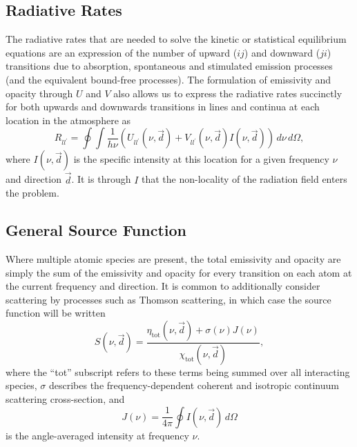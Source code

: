 \subsection{Radiative Rates}

The radiative rates that are needed to solve the kinetic or statistical equilibrium equations are an expression of the number of upward ($ij$) and downward ($ji$) transitions due to absorption, spontaneous and stimulated emission processes (and the equivalent bound-free processes).
The formulation of emissivity and opacity through $U$ and $V$ also allows us to express the radiative rates succinctly for both upwards and downwards transitions in lines and continua at each location in the atmosphere as
\begin{equation}
    \label{Eq:RadiativeRates}
    R_{ll^\prime} = \oint \int \frac{1}{h\nu} \left( U_{ll^\prime}(\nu, \vec{d}) + V_{ll^\prime}(\nu, \vec{d})I(\nu, \vec{d}) \right)\,d\nu\,d\Omega,
\end{equation}
where $I(\nu, \vec{d})$ is the specific intensity at this location for a given frequency $\nu$ and direction $\vec{d}$.
It is through $I$ that the non-locality of the radiation field enters the problem.

\subsection{General Source Function}

Where multiple atomic species are present, the total emissivity and opacity are simply the sum of the emissivity and opacity for every transition on each atom at the current frequency and direction. It is common to additionally consider scattering by processes such as Thomson scattering, in which case the source function will be written
\begin{equation}
    S(\nu, \vec{d}) = \frac{\eta_\mathrm{tot}(\nu, \vec{d}) + \sigma(\nu)J(\nu)}{\chi_\mathrm{tot}(\nu, \vec{d})},
\end{equation}
where the ``tot'' subscript refers to these terms being summed over all interacting species, $\sigma$ describes the frequency-dependent coherent and isotropic continuum scattering cross-section, and
\begin{equation}
    J(\nu) = \frac{1}{4\pi}\oint I(\nu, \vec{d})\, d\Omega
\end{equation}
is the angle-averaged intensity at frequency $\nu$.

